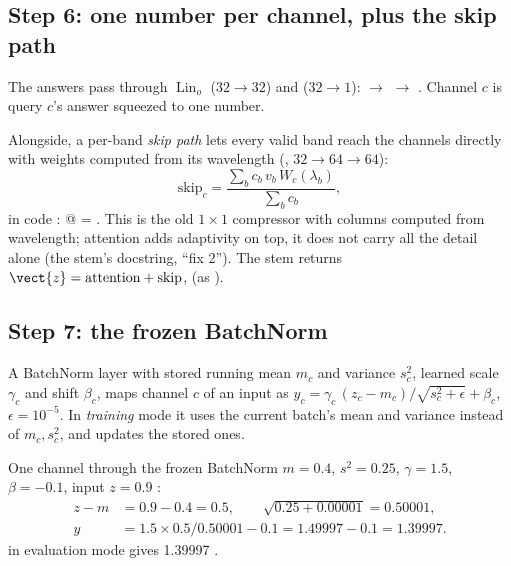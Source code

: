 \subsection{Step 6: one number per channel, plus the skip path}

The answers pass through $\operatorname{Lin}_o$ ($32\to32$) and  ($32\to1$): 
$\to$  $\to$ . Channel $c$ is query $c$'s answer squeezed to one number.

Alongside, a per-band \emph{skip path} lets every valid band reach the channels directly with weights computed from
its wavelength (, $32\to64\to64$):
\begin{equation}
\text{skip}_c=\frac{\sum_b c_b\,v_b\,W_c(\lambda_b)}{\sum_b c_b},
\end{equation}
in code :  @  = .
This is the old $1\times1$ compressor with columns computed from wavelength; attention adds adaptivity on top, it does
not carry all the detail alone (the stem's docstring, ``fix 2''). The stem returns
$\vect{z}=\text{attention}+\text{skip}$,  (as ).

\subsection{Step 7: the frozen BatchNorm}

\begin{definition}
A BatchNorm layer \citep{ioffe2015batch} with stored running mean $m_c$ and variance $s_c^2$, learned
scale $\gamma_c$ and shift $\beta_c$, maps channel $c$ of an input as
$y_c=\gamma_c\,(z_c-m_c)/\sqrt{s_c^2+\epsilon}+\beta_c$, $\epsilon=10^{-5}$. In \emph{training} mode it uses the
current batch's mean and variance instead of $m_c,s_c^2$, and updates the stored ones.
\end{definition}

\begin{worked}[label={we:namer:bn}]{One channel through the frozen BatchNorm}
$m=0.4$, $s^2=0.25$, $\gamma=1.5$, $\beta=-0.1$, input $z=0.9$ \tagA:
\begin{align*}
z-m &= 0.9-0.4 = 0.5,\qquad \sqrt{0.25+0.00001} = 0.50001,\\
y &= 1.5\times0.5/0.50001-0.1 = 1.49997-0.1 = 1.39997 .
\end{align*}
 in evaluation mode gives 1.39997 \tagC.
\end{worked}

